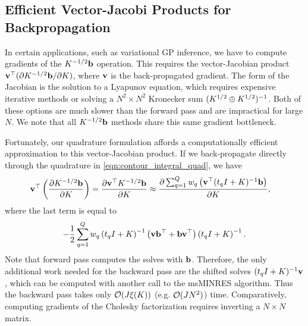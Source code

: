 \subsection{Efficient Vector-Jacobi Products for Backpropagation}

In certain applications, such as variational GP inference, we have to compute gradients of the $K^{-1/2} \mathbf{b}$ operation.
This requires the vector-Jacobian product $\mathbf{v}^\top ( \partial K^{-1/2} \mathbf{b} / \partial K)$, where $\mathbf{v}$ is the back-propagated gradient.
The form of the Jacobian is the solution to a Lyapunov equation, which requires expensive iterative methods or solving a $N^2 \times N^2$ Kronecker sum $(K^{1/2} \oplus K^{1/2})^{-1}$.
Both of these options are much slower than the forward pass and are impractical for large $N$.
We note that all $K^{-1/2} \mathbf{b}$ methods share this same gradient bottleneck.

Fortunately, our quadrature formulation affords a computationally efficient approximation to this vector-Jacobian product.
If we back-propagate directly through the quadrature in \cref{eqn:contour_integral_quad}, we have
%
\begin{align}
  \mathbf{v}^\top \left( \frac{ \partial K^{-1/2} \mathbf{b} }{ \partial K } \right)
  = \frac{ \partial \mathbf{v}^\top K^{-1/2} \mathbf{b} }{ \partial K }
  &\approx \frac{ \partial \sum_{q=1}^{Q} w_q \left( \mathbf{v}^\top (t_q I + K)^{-1} \mathbf{b} \right) }{ \partial K },
  \label{eqn:ciq_deriv}
\end{align}
%
where the last term is equal to
\[- \frac{1}{2} \sum_{q=1}^{Q} w_q \left( t_q I + K \right)^{-1} \left( \mathbf{v} \mathbf{b}^\top + \mathbf{b} \mathbf{v}^\top \right) \left( t_q I + K \right)^{-1}.\]
Note that forward pass computes the solves with $\mathbf{b}$.
Therefore, the only additional work needed for the backward pass are the shifted solves $(t_q I + K)^{-1} \mathbf{v}$, which can be computed with another call to the msMINRES algorithm.
Thus the backward pass takes only $\bigo{J \mvm{\bK}}$ (e.g. $\bigo{J N^2}$) time.
Comparatively, computing gradients of the Cholesky factorization requires inverting a $N \times N$ matrix.


